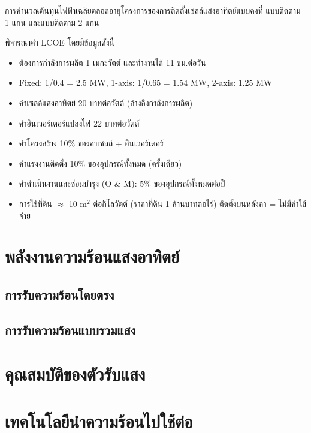\message{ !name(solar.tex)}\documentclass[
a4paper,
svgnames,
openany,
justified,
]{tufte-book}
\begin{document}
\begin{ตัวอย่าง} การคำนวณต้นทุนไฟฟ้าเฉลี่ยตลอดอายุโครงการของการติดตั้งเซลล์แสงอาทิตย์แบบคงที่ แบบติดตาม 1 แกน และแบบติดตาม 2 แกน

  พิจารณาค่า LCOE โดยมีข้อมูลดังนี้

  \begin{itemize}
  \item ต้องการกำลังการผลิต 1 เมกะวัตต์ และทำงานได้ 11 ชม.ต่อวัน
  \item Fixed: 1/0.4 = 2.5 MW, 1-axis: 1/0.65 = 1.54 MW, 2-axis: 1.25 MW
  \item ค่าเซลล์แสงอาทิตย์ 20 บาทต่อวัตต์ (อ้างอิงกำลังการผลิต)
  \item ค่าอินเวอร์เตอร์แปลงไฟ 22 บาทต่อวัตต์
  \item ค่าโครงสร้าง 10\% ของค่าเซลล์ + อินเวอร์เตอร์
  \item ค่าแรงงานติดตั้ง 10\% ของอุปกรณ์ทั้งหมด (ครั้งเดียว)
  \item ค่าดำเนินงานและซ่อมบำรุง (O \& M): 5\% ของอุปกรณ์ทั้งหมดต่อปี
  \item การใช้ที่ดิน $\approx$ 10 m$^2$ ต่อกิโลวัตต์ (ราคาที่ดิน 1 ล้านบาทต่อไร่) ติดตั้งบนหลังคา = ไม่มีค่าใช้จ่าย
  \end{itemize}
\end{ตัวอย่าง}
\begin{เฉลย}
  
\end{เฉลย}

\section{พลังงานความร้อนแสงอาทิตย์}

\subsection{การรับความร้อนโดยตรง}


\subsection{การรับความร้อนแบบรวมแสง}

\section{คุณสมบัติของตัวรับแสง}

\section{เทคโนโลยีนำความร้อนไปใช้ต่อ}
\end{document}
